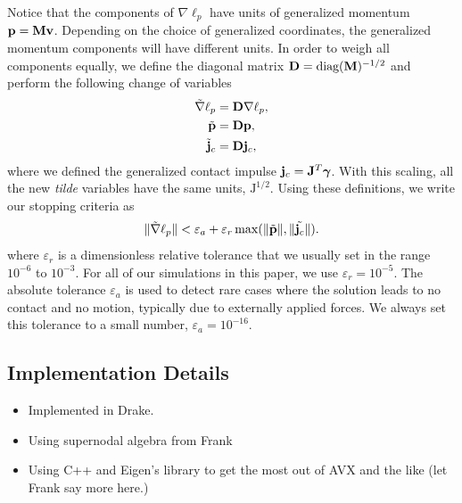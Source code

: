 Notice that the components of $\nabla\ell_p$ have units of generalized momentum
${\mathbf{p}}={\mathbf{M}}{\mathbf{v}}$. Depending on the choice of generalized coordinates, the
generalized momentum components will have different units. In order to weigh all
components equally, we define the diagonal matrix
${\mathbf{D}} = \text{diag}({\mathbf{M}})^{-1/2}$ and perform the following change of variables
\begin{align}
	\tilde{\nabla}\ell_p &= \mf{D}\nabla\ell_p, \nonumber\\
	\tilde{\mf{p}} &= \mf{D}\mf{p}, \nonumber \\
	\tilde{\mf{j}}_c &= \mf{D}\mf{j}_c,
	\label{eq:scaled_momentum_quantities}
\end{align}
where we defined the generalized contact impulse ${\mathbf{j}}_c={\mathbf{J}}^T{\bm\gamma}$.
With this scaling, all the new \emph{tilde} variables have the same units,
$\text{J}^{1/2}$. Using these definitions, we write our stopping criteria as
\begin{equation}
	\Vert\tilde{\nabla}\ell_p\Vert < \varepsilon_a + \varepsilon_r\max(\Vert\tilde{\mf{p}}\Vert,\Vert\tilde{\mf{j}_c}\Vert).
	\label{eq:stopping_criteria}
\end{equation}
where $\varepsilon_r$ is a dimensionless relative tolerance that we usually set
in the range $10^{-6}$ to $10^{-3}$. For all of our simulations in this paper, we
use $\varepsilon_r = 10^{-5}$. The absolute tolerance $\varepsilon_a$ is used to
detect rare cases where the solution leads to no contact and no motion, typically
due to externally applied forces. We always set this tolerance to a small number,
$\varepsilon_a=10^{-16}$.

\subsection{Implementation Details}
\begin{itemize}
	\item Implemented in Drake.
	\item Using supernodal algebra from Frank
	\item Using C++ and Eigen's library to get the most out of AVX and the like (let Frank say more here.)
\end{itemize}
